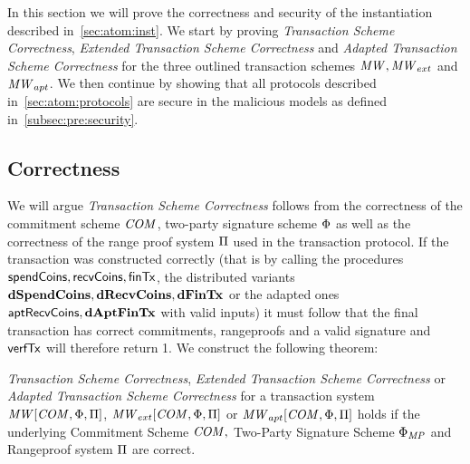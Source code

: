 In this section we will prove the correctness and security of the instantiation described in~\ref{sec:atom:inst}.
We start by proving \emph{Transaction Scheme Correctness}, \emph{Extended Transaction Scheme Correctness} and \emph{Adapted Transaction Scheme Correctness} for the three outlined transaction schemes $\mathit{MW}, \mathit{MW}_{ext}$ and $\mathit{MW}_{apt}$.
We then continue by showing that all protocols described in~\ref{sec:atom:protocols} are secure in the malicious models as defined in~\ref{subsec:pre:security}.

\subsection{Correctness} \label{subsec:atom:correctness}

We will argue \emph{Transaction Scheme Correctness} follows from the correctness of the commitment scheme $\mathit{COM}$, two-party signature scheme $\Phi$ as well as the correctness of the range proof system $\Pi$ used in the transaction protocol.
If the transaction was constructed correctly (that is by calling the procedures $\mathsf{spendCoins}, \mathsf{recvCoins}, \mathsf{finTx}$, the distributed variants $\mathbf{dSpendCoins}, \mathbf{dRecvCoins}, \mathbf{dFinTx}$ or the adapted ones $\mathsf{aptRecvCoins}, \mathbf{dAptFinTx}$ with valid inputs) it must follow that the final transaction has correct commitments, rangeproofs and a valid signature and $\mathsf{verfTx}$ will therefore return 1.
We construct the following theorem:

\begin{theorem}
    \label{lem:atom:correctness}
    \emph{Transaction Scheme Correctness}, \emph{Extended Transaction Scheme Correctness} or \emph{Adapted Transaction Scheme Correctness} for a transaction system $\mathit{MW}[\mathit{COM},\Phi,\Pi]$, $\mathit{MW}_{ext}[\mathit{COM},\Phi,\Pi]$ or $\mathit{MW}_{apt}[\mathit{COM},\Phi,\Pi]$ holds if the underlying Commitment Scheme $\mathit{COM},$ Two-Party Signature Scheme $\Phi_{\mathit{MP}}$ and Rangeproof system $\Pi$ are correct.
\end{theorem}

